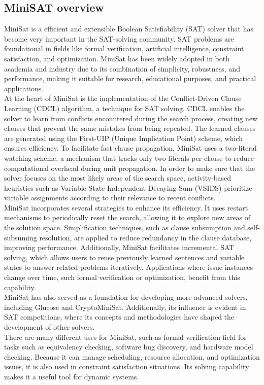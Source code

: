 \documentclass[runningheads]{llncs}
\begin{document}
\subsection{MiniSAT overview}
MiniSat is a efficient and extensible Boolean Satisfiability (SAT) solver that has become very important in the SAT-solving community. SAT problems are foundational in fields like formal verification, artificial intelligence, constraint satisfaction, and optimization. MiniSat has been widely adopted in both academia and industry due to its combination of simplicity, robustness, and performance, making it suitable for research, educational purposes, and practical applications.
\\
At the heart of MiniSat is the implementation of the Conflict-Driven Clause Learning (CDCL) algorithm, a technique for SAT solving. CDCL enables the solver to learn from conflicts encountered during the search process, creating new clauses that prevent the same mistakes from being repeated. The learned clauses are generated using the First-UIP (Unique Implication Point) scheme, which ensures efficiency. To facilitate fast clause propagation, MiniSat uses a two-literal watching scheme, a mechanism that tracks only two literals per clause to reduce computational overhead during unit propagation. In order to make sure that the solver focuses on the most likely areas of the search space, activity-based heuristics such as Variable State Independent Decaying Sum (VSIDS) prioritize variable assignments according to their relevance to recent conflicts.
\\
MiniSat incorporates several strategies to enhance its efficiency. It uses restart mechanisms to periodically reset the search, allowing it to explore new areas of the solution space. Simplification techniques, such as clause subsumption and self-subsuming resolution, are applied to reduce redundancy in the clause database, improving performance. Additionally, MiniSat facilitates incremental SAT solving, which allows users to reuse previously learned sentences and variable states to answer related problems iteratively. Applications where issue instances change over time, such formal verification or optimization, benefit from this capability. 
\\
 MiniSat has also served as a foundation for developing more advanced solvers, including Glucose and CryptoMiniSat. Additionally, its influence is evident in SAT competitions, where its concepts and methodologies have shaped the development of other solvers.
\\
There are many different uses for MiniSat, such as formal verification field for tasks such as equivalency checking, software bug discovery, and hardware model checking. Because it can manage scheduling, resource allocation, and optimization issues, it is also used in constraint satisfaction situations. Its solving capability makes it a useful tool for dynamic systems.
\\
\end{document}
